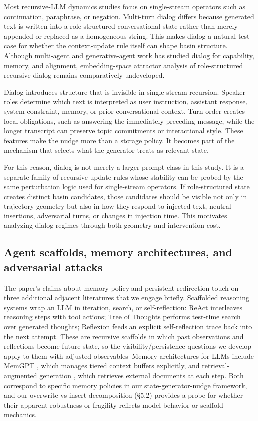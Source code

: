 \documentclass{article}
\theoremstyle{plain}
\theoremstyle{definition}
\begin{document}
Most recursive-LLM dynamics studies focus on single-stream operators such as continuation, paraphrase, or negation. Multi-turn dialog differs because generated text is written into a role-structured conversational state rather than merely appended or replaced as a homogeneous string. This makes dialog a natural test case for whether the context-update rule itself can shape basin structure. Although multi-agent and generative-agent work has studied dialog for capability, memory, and alignment, embedding-space attractor analysis of role-structured recursive dialog remains comparatively undeveloped.

Dialog introduces structure that is invisible in single-stream recursion. Speaker roles determine which text is interpreted as user instruction, assistant response, system constraint, memory, or prior conversational context. Turn order creates local obligations, such as answering the immediately preceding message, while the longer transcript can preserve topic commitments or interactional style. These features make the nudge more than a storage policy. It becomes part of the mechanism that selects what the generator treats as relevant state.

For this reason, dialog is not merely a larger prompt class in this study. It is a separate family of recursive update rules whose stability can be probed by the same perturbation logic used for single-stream operators. If role-structured state creates distinct basin candidates, those candidates should be visible not only in trajectory geometry but also in how they respond to injected text, neutral insertions, adversarial turns, or changes in injection time. This motivates analyzing dialog regimes through both geometry and intervention cost.

\subsection{Agent scaffolds, memory architectures, and adversarial attacks}

The paper's claims about memory policy and persistent redirection touch on three additional adjacent literatures that we engage briefly. Scaffolded reasoning systems wrap an LLM in iteration, search, or self-reflection: ReAct \citep{arxiv221003629} interleaves reasoning steps with tool actions; Tree of Thoughts \citep{arxiv230510601} performs test-time search over generated thoughts; Reflexion \citep{arxiv230311366} feeds an explicit self-reflection trace back into the next attempt. These are recursive scaffolds in which past observations and reflections become future state, so the visibility/persistence questions we develop apply to them with adjusted observables. Memory architectures for LLMs include MemGPT \citep{arxiv231008560}, which manages tiered context buffers explicitly, and retrieval-augmented generation \citep{arxiv200511401}, which retrieves external documents at each step. Both correspond to specific memory policies in our state-generator-nudge framework, and our overwrite-vs-insert decomposition (§5.2) provides a probe for whether their apparent robustness or fragility reflects model behavior or scaffold mechanics.
\end{document}
